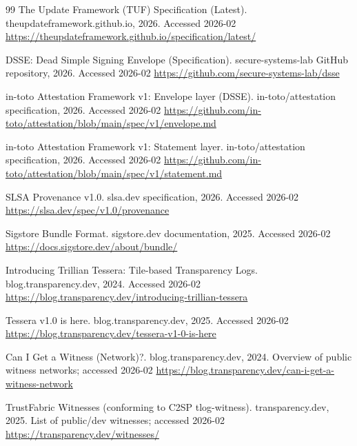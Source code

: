 \documentclass[11pt]{article}
\begin{document}
\begin{thebibliography}{99}
\newblock The Update Framework (TUF) Specification (Latest).
\newblock theupdateframework.github.io, 2026.
\newblock Accessed 2026-02
\newblock \url{https://theupdateframework.github.io/specification/latest/}

\newblock DSSE: Dead Simple Signing Envelope (Specification).
\newblock secure-systems-lab GitHub repository, 2026.
\newblock Accessed 2026-02
\newblock \url{https://github.com/secure-systems-lab/dsse}

\newblock in-toto Attestation Framework v1: Envelope layer (DSSE).
\newblock in-toto/attestation specification, 2026.
\newblock Accessed 2026-02
\newblock \url{https://github.com/in-toto/attestation/blob/main/spec/v1/envelope.md}

\newblock in-toto Attestation Framework v1: Statement layer.
\newblock in-toto/attestation specification, 2026.
\newblock Accessed 2026-02
\newblock \url{https://github.com/in-toto/attestation/blob/main/spec/v1/statement.md}

\newblock SLSA Provenance v1.0.
\newblock slsa.dev specification, 2026.
\newblock Accessed 2026-02
\newblock \url{https://slsa.dev/spec/v1.0/provenance}

\newblock Sigstore Bundle Format.
\newblock sigstore.dev documentation, 2025.
\newblock Accessed 2026-02
\newblock \url{https://docs.sigstore.dev/about/bundle/}

\newblock Introducing Trillian Tessera: Tile-based Transparency Logs.
\newblock blog.transparency.dev, 2024.
\newblock Accessed 2026-02
\newblock \url{https://blog.transparency.dev/introducing-trillian-tessera}

\newblock Tessera v1.0 is here.
\newblock blog.transparency.dev, 2025.
\newblock Accessed 2026-02
\newblock \url{https://blog.transparency.dev/tessera-v1-0-is-here}

\newblock Can I Get a Witness (Network)?.
\newblock blog.transparency.dev, 2024.
\newblock Overview of public witness networks; accessed 2026-02
\newblock \url{https://blog.transparency.dev/can-i-get-a-witness-network}

\newblock TrustFabric Witnesses (conforming to C2SP tlog-witness).
\newblock transparency.dev, 2025.
\newblock List of public/dev witnesses; accessed 2026-02
\newblock \url{https://transparency.dev/witnesses/}


\end{thebibliography}
\end{document}
